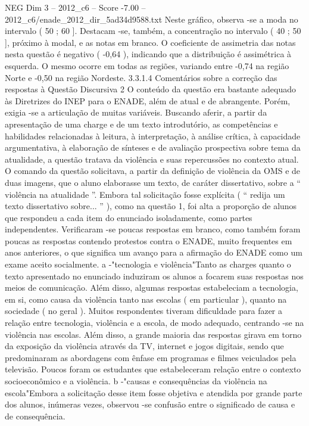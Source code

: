\begin{textsample}{NEG Dim 3 – 2012\_c6 – Score -7.00 – 2012\_c6/enade\_2012\_dir\_5ad34d9588.txt}
Neste gráfico, observa -se a moda no intervalo ( 50 ; 60 ].
Destacam -se, também, a concentração no intervalo ( 40 ; 50 ], próximo à modal, e as notas em branco.
O coeficiente de assimetria das notas nesta questão é negativo ( -0,64 ), indicando que a distribuição é assimétrica à esquerda.
O mesmo ocorre em todas as regiões, variando entre -0,74 na região Norte e -0,50 na região Nordeste. 3.3.1.4 Comentários sobre a correção das respostas à Questão Discursiva 2 O conteúdo da questão era bastante adequado às Diretrizes do INEP para o ENADE, além de atual e de abrangente.
Porém, exigia -se a articulação de muitas variáveis.
Buscando aferir, a partir da apresentação de uma charge e de um texto introdutório, as competências e habilidades relacionadas à leitura, à interpretação, à análise crítica, à capacidade argumentativa, à elaboração de sínteses e de avaliação prospectiva sobre tema da atualidade, a questão tratava da violência e suas repercussões no contexto atual.
O comando da questão solicitava, a partir da definição de violência da OMS e de duas imagens, que o aluno elaborasse um texto, de caráter dissertativo, sobre a “ violência na atualidade ”.
Embora tal solicitação fosse explícita ( “ redija um texto dissertativo sobre... ” ), como na questão 1, foi alta a proporção de alunos que respondeu a cada item do enunciado isoladamente, como partes independentes.
Verificaram -se poucas respostas em branco, como também foram poucas as respostas contendo protestos contra o ENADE, muito frequentes em anos anteriores, o que significa um avanço para a afirmação do ENADE como um exame aceito socialmente. a -"tecnologia e violência"Tanto as charges quanto o texto apresentado no enunciado induziram os alunos a focarem suas respostas nos meios de comunicação.
Além disso, algumas respostas estabeleciam a tecnologia, em si, como causa da violência tanto nas escolas ( em particular ), quanto na sociedade ( no geral ).
Muitos respondentes tiveram dificuldade para fazer a relação entre tecnologia, violência e a escola, de modo adequado, centrando -se na violência nas escolas.
Além disso, a grande maioria das respostas girava em torno da exposição da violência através da TV, internet e jogos digitais, sendo que predominaram as abordagens com ênfase em programas e filmes veiculados pela televisão.
Poucos foram os estudantes que estabeleceram relação entre o contexto socioeconômico e a violência. b -"causas e consequências da violência na escola"Embora a solicitação desse item fosse objetiva e atendida por grande parte dos alunos, inúmeras vezes, observou -se confusão entre o significado de causa e de consequência.

\end{textsample}
